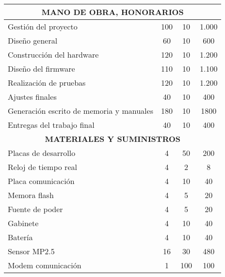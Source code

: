 \documentclass[
11pt, %
codirector, %
]{charter}
\begin{document}
\begin{enumerate}
\begin{table}[htpb]
\begin{tabularx}{\linewidth}{@{}|X|c|r|r|@{}}
		\multicolumn{4}{|c|}{\textbf{MANO DE OBRA, HONORARIOS }}\\ \hline
		Gestión del proyecto		& \multicolumn{1}{c|}{	100	} & \multicolumn{1}{c|}{	10	} &  \multicolumn{1}{c|}{	1.000	} \\ \hline
		Diseño general				& \multicolumn{1}{c|}{	60	} & \multicolumn{1}{c|}{	10	} &  \multicolumn{1}{c|}{	600	} \\ \hline
		Construcción del hardware	& \multicolumn{1}{c|}{	120	} & \multicolumn{1}{c|}{	10	} &  \multicolumn{1}{c|}{	1.200	} \\ \hline
		Diseño del firmware			& \multicolumn{1}{c|}{	110	} & \multicolumn{1}{c|}{	10	} &  \multicolumn{1}{c|}{	1.100	} \\ \hline
		Realización de pruebas		& \multicolumn{1}{c|}{	120	} & \multicolumn{1}{c|}{	10	} &  \multicolumn{1}{c|}{	1.200	} \\ \hline
		Ajustes finales				& \multicolumn{1}{c|}{	40	} & \multicolumn{1}{c|}{	10	} &  \multicolumn{1}{c|}{	400	} \\ \hline
		Generación escrito de memoria y manuales	& \multicolumn{1}{c|}{	180	} & \multicolumn{1}{c|}{	10	} &  \multicolumn{1}{c|}{	1800	} \\ \hline
		Entregas del trabajo final	& \multicolumn{1}{c|}{	40	} & \multicolumn{1}{c|}{	10	} &  \multicolumn{1}{c|}{	400	} \\ \hline
		
		\multicolumn{4}{|c|}{\textbf{MATERIALES Y SUMINISTROS}}\\ \hline
		Placas de desarrollo 	& \multicolumn{1}{c|}{	4	} & \multicolumn{1}{c|}{	50	} &  \multicolumn{1}{c|}{	200	} \\ \hline
		Reloj de tiempo real 	& \multicolumn{1}{c|}{	4	} & \multicolumn{1}{c|}{	2	} &  \multicolumn{1}{c|}{	8	} \\ \hline
		Placa comunicación		& \multicolumn{1}{c|}{	4	} & \multicolumn{1}{c|}{	10	} &  \multicolumn{1}{c|}{	40	} \\ \hline
		Memora flash			& \multicolumn{1}{c|}{	4	} & \multicolumn{1}{c|}{	5	} &  \multicolumn{1}{c|}{	20	} \\ \hline
		Fuente de poder			& \multicolumn{1}{c|}{	4	} & \multicolumn{1}{c|}{	5	} &  \multicolumn{1}{c|}{	20	} \\ \hline
		Gabinete				& \multicolumn{1}{c|}{	4	} & \multicolumn{1}{c|}{	10	} &  \multicolumn{1}{c|}{	40	} \\ \hline
		Batería					& \multicolumn{1}{c|}{	4	} & \multicolumn{1}{c|}{	10	} &  \multicolumn{1}{c|}{	40	} \\ \hline
		Sensor MP2.5			& \multicolumn{1}{c|}{	16	} & \multicolumn{1}{c|}{	30	} &  \multicolumn{1}{c|}{	480	} \\ \hline
		Modem comunicación		& \multicolumn{1}{c|}{	1	} & \multicolumn{1}{c|}{	100	} &  \multicolumn{1}{c|}{	100	} \\ \hline
		

\end{tabularx}
\end{table}
\end{enumerate}
\end{document}
